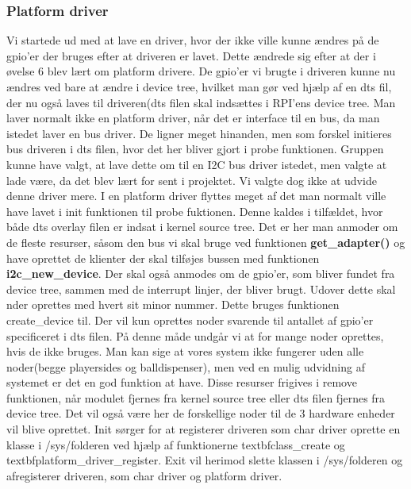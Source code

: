\documentclass[Softwaredesign/Softwaredesign_main.tex]{subfiles}
\begin{document}
\subsubsection{Platform driver}
Vi startede ud med at lave en driver, hvor der ikke ville kunne ændres på de gpio'er der bruges efter at driveren er lavet. Dette ændrede sig efter at der i øvelse 6 blev lært om platform drivere. De gpio'er vi brugte i driveren kunne nu ændres ved bare at ændre i device tree, hvilket man gør ved hjælp af en dts fil, der nu også laves til driveren(dts filen skal indsættes i RPI'ens device tree. Man laver normalt ikke en platform driver, når det er interface til en bus, da man istedet laver en bus driver. De ligner meget hinanden,  men som forskel initieres bus driveren i dts filen, hvor det her bliver gjort i probe funktionen. Gruppen kunne have valgt, at lave dette om til en I2C bus driver istedet, men valgte at lade være, da det blev lært for sent i projektet. Vi valgte dog ikke at udvide denne driver mere. I en platform driver flyttes meget af det man normalt ville have lavet i init funktionen til probe fuktionen. Denne kaldes i tilfældet, hvor både dts overlay filen er indsat i kernel source tree. Det er her man anmoder om de fleste resurser, såsom den bus vi skal bruge ved funktionen \textbf{get\_adapter()} og have oprettet de klienter der skal tilføjes bussen med funktionen \textbf{i2c\_new\_device}. Der skal også anmodes om de gpio'er, som bliver fundet fra device tree, sammen med de interrupt linjer, der bliver brugt. Udover dette skal nder oprettes med hvert sit minor nummer. Dette bruges funktionen create\_device til. Der vil kun oprettes noder svarende til antallet af gpio'er specificeret i dts filen. På denne måde undgår vi at for mange noder oprettes, hvis de ikke bruges. Man kan sige at vores system ikke fungerer uden alle  noder(begge playersides og balldispenser), men ved en mulig udvidning af systemet er det en god funktion at have. Disse resurser frigives i remove funktionen, når modulet fjernes fra kernel source tree eller dts filen fjernes fra device tree. Det vil også være her de forskellige noder til de 3 hardware enheder vil blive oprettet.
Init sørger for at registerer driveren som char driver oprette en klasse i /sys/folderen ved hjælp af funktionerne textbf{class\_create} og textbf{platform\_driver\_register}. Exit vil herimod slette klassen i /sys/folderen og afregisterer driveren, som char driver og platform driver.
\end{document}
